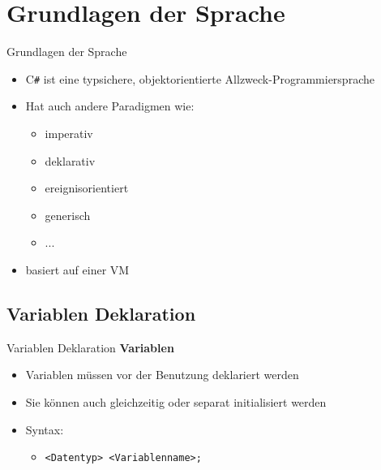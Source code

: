 \section{Grundlagen der Sprache}
\begin{frame}{Grundlagen der Sprache}
	\begin{itemize}
		\item C\texttt{\#} ist eine typsichere, objektorientierte Allzweck-Programmiersprache	
		\item Hat auch andere Paradigmen wie:
		\begin{itemize}
			\item imperativ
			\item deklarativ
			\item ereignisorientiert
			\item generisch
			\item ...
		\end{itemize}
		\item basiert auf einer VM
	\end{itemize}	
\end{frame}

\subsection{Variablen Deklaration}
\begin{frame}{Variablen Deklaration}
	\textbf{Variablen}\\
		\begin{itemize}
			\item Variablen müssen vor der Benutzung deklariert werden
			\item Sie können auch gleichzeitig oder separat initialisiert werden
			\item Syntax:
			\begin{itemize}			
				\item \texttt{\alert{<Datentyp> <Variablenname>};}
			\end{itemize}
		\end{itemize}
	
\end{frame}

